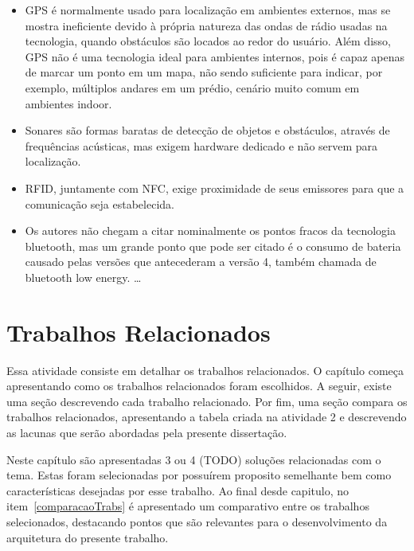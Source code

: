 \documentclass[english,brazilian]{UNISINOSmonografia}
\begin{document}
\begin{itemize}
  \item GPS é normalmente usado para localização em ambientes externos, mas se mostra ineficiente devido à própria natureza das ondas de rádio usadas na tecnologia, quando obstáculos são locados ao redor do usuário. Além disso, GPS não é uma tecnologia ideal para ambientes internos, pois é capaz apenas de marcar um ponto em um mapa, não sendo suficiente para indicar, por exemplo, múltiplos andares em um prédio, cenário muito comum em ambientes indoor. 
  \item Sonares são formas baratas de detecção de objetos e obstáculos, através de frequências acústicas, mas exigem hardware dedicado e não servem para localização.
  \item RFID, juntamente com NFC, exige proximidade de seus emissores para que a comunicação seja estabelecida.
  \item Os autores não chegam a citar nominalmente os pontos fracos da tecnologia bluetooth, mas um grande ponto que pode ser citado é o consumo de bateria causado pelas versões que antecederam a versão 4, também chamada de bluetooth low energy.    \ldots
\end{itemize}

\chapter{Trabalhos Relacionados}

Essa atividade consiste em detalhar os trabalhos relacionados. O capítulo começa apresentando como os trabalhos relacionados foram escolhidos. A seguir, existe uma seção descrevendo cada trabalho relacionado. Por fim, uma seção compara os trabalhos relacionados, apresentando a tabela criada na atividade 2 e descrevendo as lacunas que serão abordadas pela presente dissertação.

Neste capítulo são apresentadas 3 ou 4 (TODO) soluções relacionadas com o tema. Estas foram selecionadas por possuírem proposito semelhante bem como características desejadas por esse trabalho. Ao final desde capitulo, no item~\ref{comparacaoTrabs} é apresentado um comparativo entre os trabalhos selecionados, destacando pontos que são relevantes para o desenvolvimento da arquitetura do presente trabalho.
\end{document}
